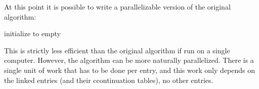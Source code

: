 \documentclass{article}
\begin{document}
At this point it is possible to write a parallelizable version of the original algorithm:

\begin{algorithm}
  initialize \Ctables to empty\;
   {
     {
    }
  }
  \;
\end{algorithm}

This is strictly less efficient than the original algorithm if run on a single computer.  However, the algorithm can be more naturally parallelized.  There is a single unit of work that has to be done per entry, and this work only depends on the linked entries (and their ccontinuation tables), no other entries.
\end{document}
